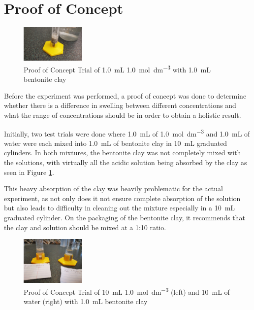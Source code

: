 \documentclass[11pt, letterpaper]{article}
\begin{document}
\section{Proof of Concept}

\begin{figure}
    \begin{center}
        \includegraphics[width=0.28\textwidth]{poc1MHCL.jpg}
    \end{center}
    \caption{Proof of Concept Trial of \SI{1.0}{mL} \SI{1.0}{mol.dm^{-3}}  with \SI{1.0}{mL} bentonite clay}
    \label{fig:poc1MHCL}
\end{figure}

Before the experiment was performed, a proof of concept
was done to determine whether there is a difference
in swelling between different concentrations and what the
range of concentrations should be in order to obtain
a holistic result.

Initially, two test trials were done where \SI{1.0}{mL} of
\SI{1.0}{mol.dm^{-3}}  and \SI{1.0}{mL} of water
were each mixed into \SI{1.0}{mL} of bentonite clay in
\SI{10}{mL} graduated cylinders. In both mixtures, the
bentonite clay was not completely mixed with the solutions,
with virtually all the acidic solution being absorbed by the
clay as seen in Figure \ref*{fig:poc1MHCL}.

This heavy absorption of the clay was heavily problematic
for the actual experiment, as not only does it not ensure
complete absorption of the solution but also leads to difficulty
in cleaning out the mixture especially in a \SI{10}{mL} graduated
cylinder. On the packaging of the bentonite clay, it recommends
that the clay and solution should be mixed at a 1:10 ratio.

\begin{figure}
    \begin{center}
        \includegraphics[width=0.28\textwidth]{betterPOC.jpg}
    \end{center}
    \caption{Proof of Concept Trial of \SI{10}{mL} \SI{1.0}{mol.dm^{-3}}  (left) and \SI{10}{mL} of water (right) with \SI{1.0}{mL} bentonite clay}
    \label{fig:betterPOC}
\end{figure}
\end{document}

